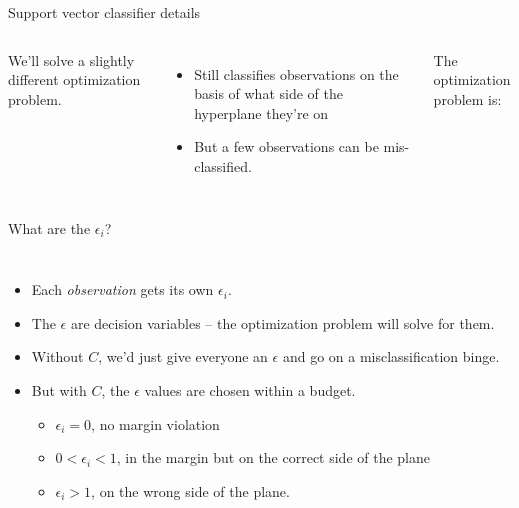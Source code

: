 \documentclass[mathserif, aspectratio=169]{beamer}
\begin{document}
\begin{frame}{Support vector classifier details}

\begin{columns}
We'll solve a slightly different optimization problem.
\begin{itemize}
\item Still classifies observations on the basis of what side of the hyperplane they're on
\item But a few observations can be mis-classified.
\end{itemize}
The optimization problem is: 
\vspace{40mm}
\end{columns}
\end{frame}

\begin{frame}{What are the $\epsilon_i$?}

\begin{columns}
\begin{itemize}
\item Each \textit{observation} gets its own $\epsilon_i$.  
\item The $\epsilon$ are decision variables -- the optimization problem will solve for them.  
\item Without $C$, we'd just give everyone an $\epsilon$ and go on a misclassification binge.  
\item But with $C$, the $\epsilon$ values are chosen within a budget. 
\begin{itemize}
\item $\epsilon_i = 0$, no margin violation
\item $0<\epsilon_i<1$, in the margin but on the correct side of the plane
\item  $\epsilon_i>1$, on the wrong side of the plane.  
\end{itemize}
\end{itemize}
\end{columns}
\end{frame}
\end{document}
